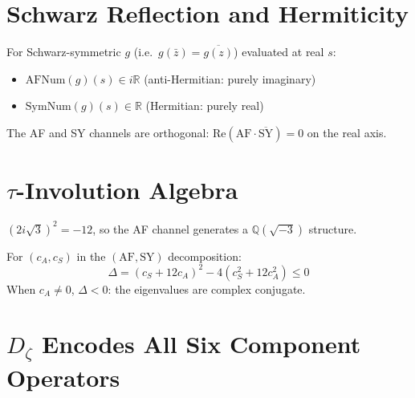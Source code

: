 \section{Schwarz Reflection and Hermiticity}
\label{sec:schwarz_hermiticity}

\begin{theorem}
\label{thm:channel_hermiticity}
\leanok
For Schwarz-symmetric $g$ (i.e.\ $g(\bar{z}) = \overline{g(z)}$) evaluated at real $s$:
\begin{itemize}
\item $\mathrm{AFNum}(g)(s) \in i\mathbb{R}$ (anti-Hermitian: purely imaginary)
\item $\mathrm{SymNum}(g)(s) \in \mathbb{R}$ (Hermitian: purely real)
\end{itemize}
\end{theorem}

\begin{theorem}
\label{thm:spacetime_orthogonality}
\leanok
The AF and SY channels are orthogonal: $\mathrm{Re}(\mathrm{AF} \cdot \overline{\mathrm{SY}}) = 0$ on the real axis.
\end{theorem}

\section{\texorpdfstring{$\tau$}{τ}-Involution Algebra}
\label{sec:tau_involution}

\begin{theorem}[$\mathrm{AF\_coeff}^2 = -12$]
\label{thm:AF_coeff_sq}
\leanok
$(2i\sqrt{3})^2 = -12$, so the AF channel generates a $\mathbb{Q}(\sqrt{-3})$ structure.
\end{theorem}

\begin{theorem}
\label{thm:tau_discriminant}
\leanok
For $(c_A, c_S)$ in the $(\mathrm{AF}, \mathrm{SY})$ decomposition:
\[
\Delta = (c_S + 12c_A)^2 - 4(c_S^2 + 12c_A^2) \leq 0
\]
When $c_A \neq 0$, $\Delta < 0$: the eigenvalues are complex conjugate.
\end{theorem}

\section{\texorpdfstring{$D_\zeta$}{Dζ} Encodes All Six Component Operators}
\label{sec:dzeta_encodes}

